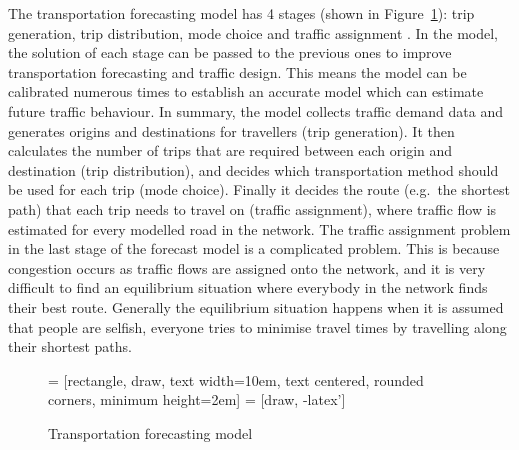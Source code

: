 The transportation forecasting model has 4 stages (shown in Figure~\ref{fig:model}):
trip generation, trip distribution, mode choice and traffic assignment \citep{Sheffi}.
In the model, the solution of each stage can be passed to the previous ones to improve transportation forecasting and traffic design.
This means the model can be calibrated numerous times to establish an accurate model which can estimate future traffic behaviour.
In summary, 
the model collects traffic demand data and 
generates origins and destinations for travellers (trip generation).
It then calculates the number of trips that are required between each origin and destination (trip distribution),
and decides which transportation method should be used for each trip (mode choice).
Finally it decides the route (e.g.\ the shortest path) that each trip needs to travel on (traffic assignment), 
where traffic flow is estimated for every modelled road in the network.
The traffic assignment problem in the last stage of the forecast model is a complicated problem.
This is because congestion occurs as traffic flows are assigned onto the network,
and it is very difficult to find an equilibrium situation where everybody in the network finds their best route.
Generally the equilibrium situation happens when it is assumed that people are selfish,
everyone tries to minimise travel times by travelling along their shortest paths.

\begin{figure}[!ht]
    \centering
     = [rectangle, draw, text width=10em, text centered, rounded corners, minimum height=2em]
     = [draw, -latex']
    \caption{Transportation forecasting model}
    \label{fig:model}
\end{figure}

